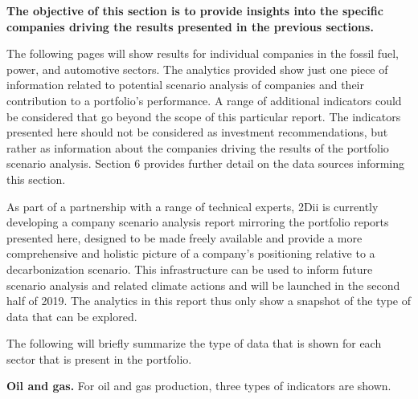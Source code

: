 \documentclass[10pt,table]{article}\usepackage[]{graphicx}\usepackage[]{color}
\begin{document}
	\begin{multicols}{2}

		\textbf{The objective of this section is to provide insights into the specific companies driving the results presented in the previous sections.}

		The following pages will show results for individual companies in the fossil fuel, power, and automotive sectors. The analytics provided show just one piece of information related to potential scenario analysis of companies and their contribution to a portfolio's performance. A range of additional indicators could be considered that go beyond the scope of this particular report. The indicators presented here should not be considered as investment recommendations, but rather as information about the companies driving the results of the portfolio scenario analysis. Section 6 provides further detail on the data sources informing this section. 

		As part of a partnership with a range of technical experts, 2Dii is currently developing a company scenario analysis report mirroring the portfolio reports presented here, designed to be made freely available and provide a more comprehensive and holistic picture of a company's positioning relative to a decarbonization scenario. This infrastructure can be used to inform future scenario analysis and related climate actions and will be launched in the second half of 2019. The analytics in this report thus only show a snapshot of the type of data that can be explored. 

		The following will briefly summarize the type of data that is shown for each sector that is present in the portfolio. 

		\textbf{Oil and gas.} For oil and gas production, three types of indicators are shown. 


\end{multicols}
\end{document}
